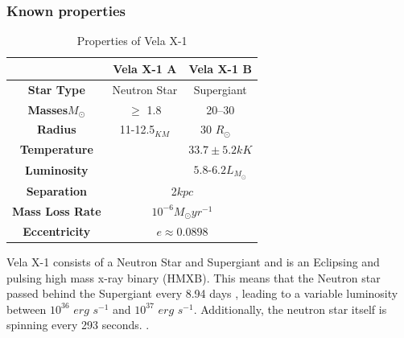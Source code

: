 \documentclass[12pt, a4paper]{article}
\begin{document}
    \begin{table} [H]
            \subsubsection{Known properties}
            \begin{center}
                \begin{tabular}{||c || c | c||} 
                 \hline
                 & Vela X-1 A & Vela X-1 B  \\ 
                 \hline\hline
                 \textbf{Star Type} & Neutron Star & Supergiant \parencite{Kretschmar_2021} \\ 
                 \hline
                 \textbf{Masses}\(M_\odot\) & $\ge$ 1.8 \parencite{Kretschmar_2021} & 20–30 \parencite{Kretschmar_2021} \\
                 \hline
                 \textbf{Radius} & 11-12.5$_{KM}$ \parencite{Kretschmar_2021} & 30 \(R_\odot\)
                ~\parencite{Kretschmar_2021} \\
                 \hline 
                 \textbf{Temperature} &  & $33.7 \pm 5.2 kK$ \parencite{Kretschmar_2021}\\ 
                 \hline
                 \textbf{Luminosity} & & $5.8$-$6.2 L_{M_\odot}$ \parencite{Kretschmar_2021} \\
                 \hline
                 \textbf{Separation} & \multicolumn{2}{c||}{2$kpc$ \parencite{Kretschmar_2021}} \\
                 \hline 
                 \textbf{Mass Loss Rate} & \multicolumn{2}{c||}{$10^{-6} M_\odot yr^{-1}$ \parencite{Kretschmar_2021}} \\
                 \hline
                 \textbf{Eccentricity} & \multicolumn{2}{c||}{$ e \approx  0.0898$ \parencite{Kretschmar_2021}} \\
                 \hline
                \end{tabular}
                \caption{Properties of Vela X-1} 
                \label{VelaX1} 

            \end{center}
    \end{table}

        Vela X-1 consists of a Neutron Star and Supergiant and is an Eclipsing and pulsing high mass x-ray binary (HMXB). This means that the Neutron star passed behind the Supergiant every 8.94 days \parencite{Falanga_2015}, leading to a variable luminosity between $10^{36}$ $erg$ $s^{-1}$ and $10^{37}$ $erg$ $s^{-1}$. Additionally, the neutron star itself is spinning every 293 seconds. \parencite{Kretschmar_2021}. 
        
\end{document}
